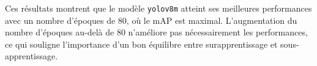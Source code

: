 \begin{flushleft}
	Ces résultats montrent que le modèle \texttt{yolov8m} atteint ses meilleures performances avec un nombre d'époques de 80, où le mAP est maximal. L'augmentation du nombre d'époques au-delà de 80 n'améliore pas nécessairement les performances, ce qui souligne l'importance d'un bon équilibre entre surapprentissage et sous-apprentissage.
\end{flushleft}


